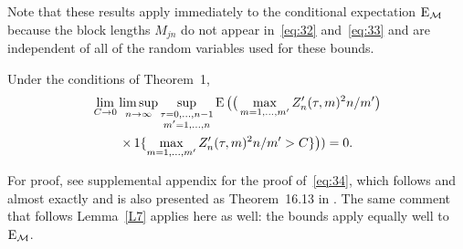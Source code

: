 \documentclass[11pt]{article}
\begin{document}
Note that these results apply immediately to the conditional expectation
$\operatorname{E}_{\mathcal{M}}$ because the block lengths $M_{jn}$ do not appear in~\eqref{eq:32}
and~\eqref{eq:33} and are independent of all of the random variables
used for these bounds.

\begin{lem}\label{L8}
\newcommand{\uiterm}{\max_{m \in 1,\dots,m'} \Big(
  \sum_{t \in I_n(\tau, m)} (X_{nt} - \mu_{nt})\Big)^2 \Big/
  \sum_{t\in I_n(\tau, m')} c_{nt}^2}
\newcommand{\uitermb}{(1/m') \max_{m \in 1,\dots,m'} \Big(
  \sum_{t \in I_n^*(\tau, m)} (X_{nt} - \mu_{nt})\Big)^2}
  Under the conditions of Theorem~1,
  \begin{multline}\label{eq:34}
    \lim_{C \to 0} \limsup_{n \to \infty} \sup_{\substack{\tau = 0,\dots,n-1 \\  m' = 1,\dots,n}}
    \operatorname{E}\big(\big(\max_{m=1,\dots,m'} Z'_n(\tau, m)^2 n / m'\big) \\
    \times\operatorname{1}\{\max_{m=1,\dots,m'} Z'_n(\tau, m)^2 n / m' > C\}\big)) = 0.
  \end{multline}
\end{lem}

For proof, see supplemental appendix for the proof of~\eqref{eq:34}, which
follows \citet[Lemma 6.5]{Mcl:75b} and \citet[Lemma 3.5]{Mcl:77}
almost exactly and is also presented as Theorem~16.13 in
\citet{Dav:94}. The same comment that follows
Lemma~\ref{L7} applies here as well: the bounds
apply equally well to $\operatorname{E}_{\mathcal{M}}$.


\end{document}
